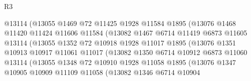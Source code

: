 \begin{lexlean}{R3}
\begin{coremodule}
                              @13114
                              (@13055
                                @1469
                                @72
                                @11425
                                @1928
                                @11584
                                @1895
                                (@13076
                                  @1468
                                  @11420
                                  @11424
                                  @11606
                                  @11584
                                  (@13082
                                    @1467
                                    @6714
                                    @11419
                                    @6873
                                    @11605
                                    @13114
                                    (@13055
                                      @1352
                                      @72
                                      @10918
                                      @1928
                                      @11017
                                      @1895
                                      (@13076
                                        @1351
                                        @10913
                                        @10917
                                        @11061
                                        @11017
                                        (@13082
                                          @1350
                                          @6714
                                          @10912
                                          @6873
                                          @11060
                                          @13114
                                          (@13055
                                            @1348
                                            @72
                                            @10910
                                            @1928
                                            @11058
                                            @1895
                                            (@13076
                                              @1347
                                              @10905
                                              @10909
                                              @11109
                                              @11058
                                              (@13082
                                                @1346
                                                @6714
                                                @10904

\end{coremodule}
\end{lexlean}
